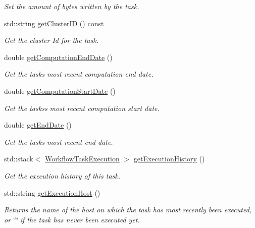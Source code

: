 \begin{DoxyCompactItemize}
\begin{DoxyCompactList}\small\item\em Set the amount of bytes written by the task. \end{DoxyCompactList}\item 
std\+::string \hyperlink{classwrench_1_1_workflow_task_a46ed2cbccf91f55c73fb99900a953d60}{get\+Cluster\+ID} () const
\begin{DoxyCompactList}\small\item\em Get the cluster Id for the task. \end{DoxyCompactList}\item 
double \hyperlink{classwrench_1_1_workflow_task_aa02796c5c85aa9fb9a1467eb06506a59}{get\+Computation\+End\+Date} ()
\begin{DoxyCompactList}\small\item\em Get the task\textquotesingle{}s most recent computation end date. \end{DoxyCompactList}\item 
double \hyperlink{classwrench_1_1_workflow_task_ab2caf3128cc4c396a1323ac74081fe0f}{get\+Computation\+Start\+Date} ()
\begin{DoxyCompactList}\small\item\em Get the tasks\textquotesingle{}s most recent computation start date. \end{DoxyCompactList}\item 
double \hyperlink{classwrench_1_1_workflow_task_a2c413ff97c665416c2c68898ef986df0}{get\+End\+Date} ()
\begin{DoxyCompactList}\small\item\em Get the task\textquotesingle{}s most recent end date. \end{DoxyCompactList}\item 
std\+::stack$<$ \hyperlink{structwrench_1_1_workflow_task_1_1_workflow_task_execution}{Workflow\+Task\+Execution} $>$ \hyperlink{classwrench_1_1_workflow_task_a69dc57568ee24ef1d2824e9f6d919d48}{get\+Execution\+History} ()
\begin{DoxyCompactList}\small\item\em Get the execution history of this task. \end{DoxyCompactList}\item 
std\+::string \hyperlink{classwrench_1_1_workflow_task_af166a3b9b4b9d7a62711d3431961cd4f}{get\+Execution\+Host} ()
\begin{DoxyCompactList}\small\item\em Returns the name of the host on which the task has most recently been executed, or \char`\"{}\char`\"{} if the task has never been executed yet. \end{DoxyCompactList}\item 

\end{DoxyCompactItemize}
